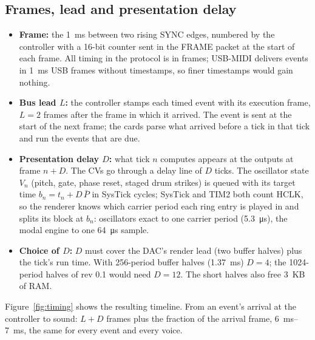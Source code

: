 \documentclass[11pt,a4paper]{article}
\begin{document}
\subsection{Frames, lead and presentation delay}
\begin{itemize}
  \item \textbf{Frame:} the \SI{1}{ms} between two rising SYNC edges, numbered by the controller with a 16-bit counter
    sent in the FRAME packet at the start of each frame. All timing in the protocol is in frames; USB-MIDI delivers
    events in \SI{1}{ms} USB frames without timestamps, so finer timestamps would gain nothing.
  \item \textbf{Bus lead $L$:} the controller stamps each timed event with its execution frame, $L = 2$ frames after
    the frame in which it arrived. The event is sent at the start of the next frame; the cards parse what arrived before
    a tick in that tick and run the events that are due.
  \item \textbf{Presentation delay $D$:} what tick $n$ computes appears at the outputs at frame $n + D$. The CVs go
    through a delay line of $D$ ticks. The oscillator state $V_n$ (pitch, gate, phase reset, staged drum strikes) is
    queued with its target time $b_n = t_n + D\,\bar P$ in SysTick cycles; SysTick and TIM2 both count HCLK, so the
    renderer knows which carrier period each ring entry is played in and splits its block at $b_n$: oscillators exact
    to one carrier period (\SI{5.3}{\micro s}), the modal engine to one \SI{64}{\micro s} sample.
  \item \textbf{Choice of $D$:} $D$ must cover the DAC's render lead (two buffer halves) plus the tick's run time.
    With 256-period buffer halves (\SI{1.37}{ms}) $D = 4$; the 1024-period halves of rev 0.1 would need $D = 12$.
    The short halves also free \SI{3}{KB} of RAM.
\end{itemize}
Figure~\ref{fig:timing} shows the resulting timeline. From an event's arrival at the controller to sound:
$L + D$ frames plus the fraction of the arrival frame, \SIrange{6}{7}{ms}, the same for every event and every voice.
\end{document}
